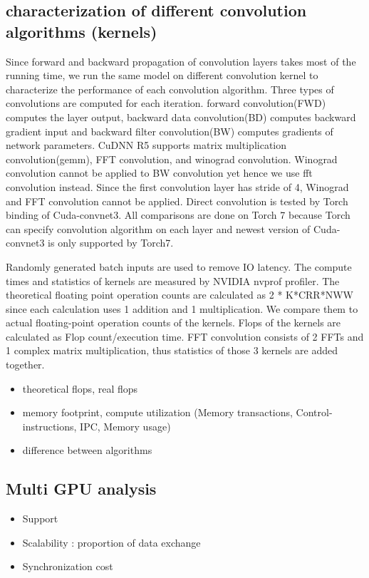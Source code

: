 \documentclass[conference]{IEEEtran}
\begin{document}
\subsection{characterization of different convolution algorithms (kernels)}
Since forward and backward propagation of convolution layers takes most of the running time, we run the same model on different convolution kernel to characterize the performance of each convolution algorithm.
Three types of convolutions are computed for each iteration.
forward convolution(FWD) computes the layer output, backward data convolution(BD) computes backward gradient input and backward filter convolution(BW) computes gradients of network parameters.
CuDNN R5 supports matrix multiplication convolution(gemm), FFT convolution, and winograd convolution.
Winograd convolution cannot be applied to BW convolution yet hence we use fft convolution instead.
Since the first convolution layer has stride of 4, Winograd and FFT convolution cannot be applied.
Direct convolution is tested by Torch binding of Cuda-convnet3.
All comparisons are done on Torch 7 because Torch can specify convolution algorithm on each layer and newest version of Cuda-convnet3 is only supported by Torch7.

Randomly generated batch inputs are used to remove IO latency.
The compute times and statistics of kernels are measured by NVIDIA nvprof profiler.
The theoretical floating point operation counts are calculated as 2 * K*CRR*NWW since each calculation uses 1 addition and 1 multiplication.
We compare them to actual floating-point operation counts of the kernels.
Flops of the kernels are calculated as Flop count/execution time.
FFT convolution consists of 2 FFTs and 1 complex matrix multiplication, thus statistics of those 3 kernels are added together.

\begin{itemize}
  \item theoretical flops, real flops
  \item memory footprint, compute utilization (Memory transactions, Control-instructions, IPC, Memory usage)
  \item difference between algorithms
\end{itemize}

\subsection{Multi GPU analysis}

\begin{itemize}
  \item Support
  \item Scalability : proportion of data exchange
  \item Synchronization cost
\end{itemize}
\end{document}
